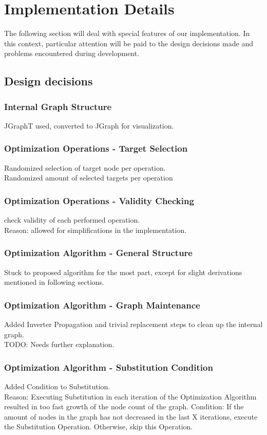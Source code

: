 \documentclass[
	accentcolor=1c,%
	type=intern,
	marginpar=false,
	ruledheaders=section,
	class=report,
	BCOR=5mm,
      parskip=half-,
	fontsize=10pt
	]{tudapub}
\begin{document}
	\newpage
	\section{Implementation Details}
	The following section will deal with special features of our implementation.
	In this context, particular attention will be paid to the design decisions made and problems encountered during development.
	\subsection{Design decisions}
	\subsubsection{Internal Graph Structure}
	JGraphT used, converted to JGraph for visualization.
	\subsubsection{Optimization Operations - Target Selection}
	Randomized selection of target node per operation.\\
	Randomized amount of selected targets per operation
	\subsubsection{Optimization Operations - Validity Checking}
	check validity of each performed operation.\\
	Reason: allowed for simplifications in the implementation.
	\subsubsection{Optimization Algorithm - General Structure}
	Stuck to proposed algorithm for the most part, except for slight derivations mentioned in following sections.
	\subsubsection{Optimization Algorithm - Graph Maintenance}
	Added Inverter Propagation and trivial replacement steps to clean up the internal graph.\\
	TODO: Needs further explanation.
	\subsubsection{Optimization Algorithm - Substitution Condition}
	Added Condition to Substitution.\\
	Reason: Executing Substitution in each iteration of the Optimization Algorithm resulted in too fast growth of the node count of the graph.
	Condition: If the amount of nodes in the graph has not decreased in the last X iterations, execute the Substitution Operation. Otherwise, skip this Operation.
\end{document}
